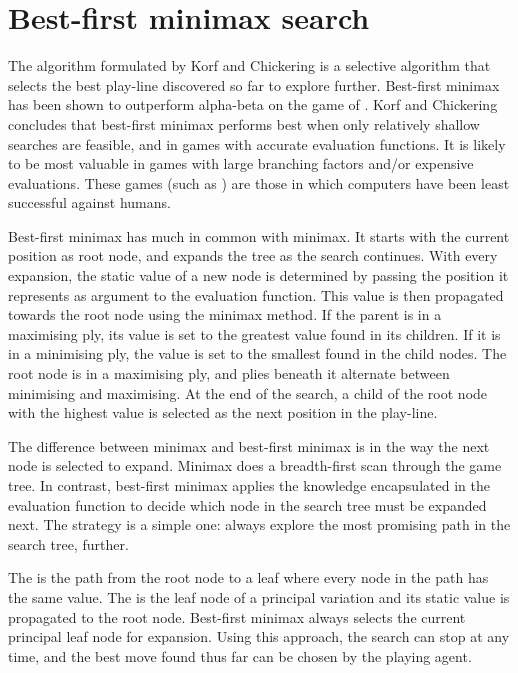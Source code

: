 
\section{Best-first minimax search}
\label{sec:tree-best-first}
The  algorithm formulated by Korf and Chickering  \cite{korf:best} is a selective algorithm that selects the best play-line discovered so far to explore further. Best-first minimax has been shown to outperform alpha-beta on the game of .  Korf and Chickering concludes that best-first minimax performs best when only relatively shallow searches are feasible, and in games with accurate evaluation functions.  It is likely to be most valuable in games with large branching factors and/or expensive evaluations.  These games (such as ) are those in which computers have been least successful against humans.    

Best-first minimax has much in common with minimax. It starts with the current position as root node, and expands the tree as the search continues.  With every expansion, the static value of a new node is determined by passing the position it represents as argument to the evaluation function.  This value is then propagated towards the root node using the minimax method. If the parent is in a maximising ply, its value is set to the greatest value found in its children.  If it is in a minimising ply, the value is set to the smallest found in the child nodes.  The root node is in a maximising ply, and plies beneath it alternate between minimising and maximising. At the end of the search, a child of the root node with the highest value is selected as the next position in the play-line.  

The difference between minimax and best-first minimax is in the way the next node is selected to expand.  Minimax does a breadth-first scan through the game tree.  In contrast, best-first minimax  applies the  knowledge encapsulated in the evaluation function to decide which node in the search tree must be expanded next. The strategy is a simple one: always explore the most promising path in the search tree, further.  

The  is the path from the root node to a leaf where every node in the path has the same value.  The  is the leaf node of a principal variation and its static value is propagated to the root node.  Best-first minimax always selects the current principal leaf node for expansion.  Using this approach, the search can stop at any time, and the best move found thus far can be chosen by the playing agent.

